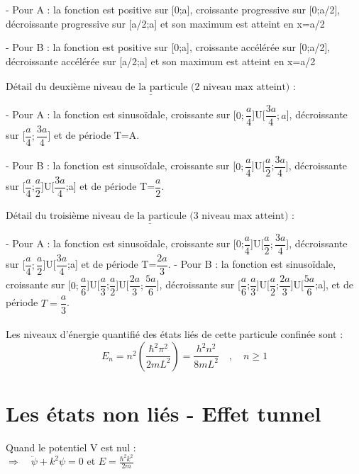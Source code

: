 \documentclass[11pt]{report}
\begin{document}
- Pour A : la fonction est positive sur [0;a], croissante progressive sur [0;a/2], décroissante progressive sur [a/2;a] et son maximum est atteint en x=a/2

- Pour B : la fonction est positive sur [0;a], croissante accélérée sur [0;a/2], décroissante accélérée sur [a/2;a] et son maximum est atteint en x=a/2\\
\\
$\underline{\textrm{Détail du deuxième niveau de la particule (2 niveau max atteint) :}}$

- Pour A : la fonction est sinusoïdale, croissante sur [$0;\dfrac{a}{4}$]U[$\dfrac{3a}{4};a$], décroissante sur [$\dfrac{a}{4};\dfrac{3a}{4}$] et de période T=A.

- Pour B : la fonction est sinusoïdale, croissante sur [$0;\dfrac{a}{4}$]U[$\dfrac{a}{2}$;$\dfrac{3a}{4}$], décroissante sur [$\dfrac{a}{4}$;$\dfrac{a}{2}$]U[$\dfrac{3a}{4}$;a] et de période T=$\dfrac{a}{2}$.\\
\\
$\underline{\textrm{Détail du troisième niveau de la particule (3 niveau max atteint) :}}$

- Pour A : la fonction est sinusoïdale, croissante sur [0;$\dfrac{a}{4}$]U[$\dfrac{a}{2};\dfrac{3a}{4}$], décroissante sur [$\dfrac{a}{4};\dfrac{a}{2}$]U[$\dfrac{3a}{4}$;a] et de période T=$\dfrac{2a}{3}$.
- Pour B : la fonction est sinusoïdale, croissante sur [$0;\dfrac{a}{6}$]U[$\dfrac{a}{3}$;$\dfrac{a}{2}$]U[$\dfrac{2a}{3};\dfrac{5a}{6}$], décroissante sur [$\dfrac{a}{6}$;$\dfrac{a}{3}$]U[$\dfrac{a}{2}$;$\dfrac{2a}{3}$]U[$\dfrac{5a}{6}$;a], et de période $T=\dfrac{a}{3}$.\\
\\

Les niveaux d'énergie quantifié des états liés de cette particule confinée sont :\\
\begin{equation}
    E_n = n^2(\dfrac{\hbar^2\pi^2}{2mL^2})=\dfrac{h^2n^2}{8mL^2} \quad, \quad n\geq 1
    \nonumber
\end{equation}



\newpage
\section{Les états non liés - Effet tunnel}
Quand le potentiel V est nul : \\

$\Rightarrow \quad \ddot\psi + k^2\psi = 0$ et $E=\frac{\hbar^2 k^2}{2m}$\\ 
\end{document}
